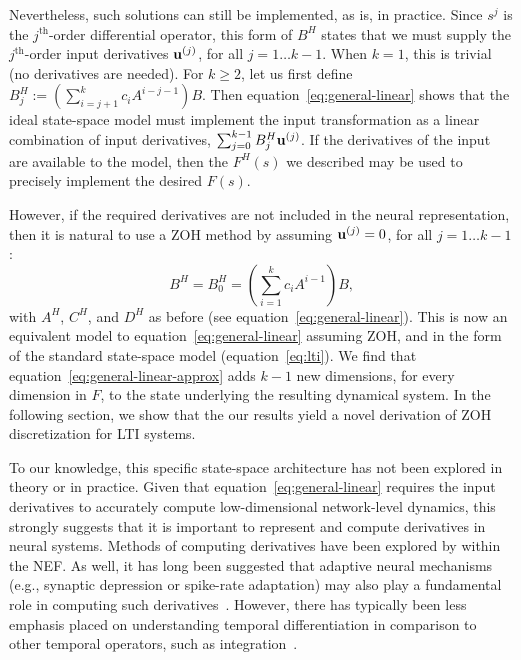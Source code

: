Nevertheless, such solutions can still be implemented, as is, in practice.
Since $s^j$ is the $j^{\text{th}}$-order differential operator, this form of $B^H$ states that we must supply the $j^{\text{th}}$-order input derivatives $\mathbf{u}^{(j)}$, for all $j = 1 \ldots k - 1$.
When $k = 1$, this is trivial (no derivatives are needed).
For $k \ge 2$, let us first define $B^H_j:= \left( \sum_{i=j+1}^k c_i A^{i-j-1} \right) B$.
Then equation~\ref{eq:general-linear} shows that the ideal state-space model must implement the input transformation as a linear combination of input derivatives, $\sum_{j=0}^{k-1} B^H_j \mathbf{u}^{(j)}$.
If the derivatives of the input are available to the model, then the $F^{H}(s)$ we described may be used to precisely implement the desired $F(s)$.

However, if the required derivatives are not included in the neural representation, then it is natural to use a ZOH method by assuming $\mathbf{u}^{(j)} = 0$, for all $j = 1 \ldots k - 1$:
\begin{equation} \label{eq:general-linear-approx}
B^H = B^H_0 =  \left( \sum_{i=1}^k c_i A^{i-1} \right) B \text{,}
\end{equation}
with $A^H$, $C^H$, and $D^H$ as before (see equation~\ref{eq:general-linear}).
This is now an equivalent model to equation~\ref{eq:general-linear} assuming ZOH, and in the form of the standard state-space model (equation~\ref{eq:lti}).
We find that equation~\ref{eq:general-linear-approx} adds $k - 1$ new dimensions, for every dimension in $F$, to the state underlying the resulting dynamical system.
In the following section, we show that the our results yield a novel derivation of ZOH discretization for LTI systems.

To our knowledge, this specific state-space architecture has not been explored in theory or in practice.
Given that equation~\ref{eq:general-linear} requires the input derivatives to accurately compute low-dimensional network-level dynamics, this strongly suggests that it is important to represent and compute derivatives in neural systems.
Methods of computing derivatives have been explored by \citet{tripp2010} within the NEF.
As well, it has long been suggested that adaptive neural mechanisms (e.g., synaptic depression or spike-rate adaptation) may also play a fundamental role in computing such derivatives~\citep{abbott2004synaptic, lundstrom2008fractional}.
However, there has typically been less emphasis placed on understanding temporal differentiation in comparison to other temporal operators, such as integration~\citep{tripp2010}.

